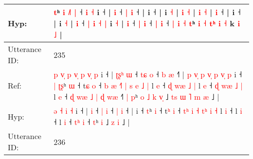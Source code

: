 \documentclass[10pt]{article}
\DeclareRobustCommand{\hl}[1]{{\textcolor{red}{#1}}}
\begin{document}
\begin{longtable}{ll}
 \\
Hyp: & \hl{}\hl{t}ʰ \hl{i} \hl{}\hl{˩}\hl{˥} \hl{|} ˧ \hl{i} \hl{˧} i ˧ |\hl{}\hl{}\hl{}\hl{} \hl{i} ˧ \hl{|} \hl{i} ˧ |\hl{}\hl{} i ˧ |\hl{}\hl{}\hl{} i \hl{}\hl{˧} | \hl{}\hl{i} \hl{}\hl{˧} |\hl{}\hl{}\hl{}\hl{}\hl{}\hl{}\hl{}\hl{}\hl{} \hl{i} \hl{}\hl{˧} |\hl{}\hl{} \hl{}\hl{i} ˧\hl{}\hl{}\hl{}\hl{}\hl{}\hl{}\hl{} |\hl{}\hl{} i ˧\hl{}\hl{}\hl{}\hl{}\hl{}\hl{} |\hl{}\hl{}\hl{}\hl{}\hl{}\hl{} i \hl{˧} |\hl{}\hl{} \hl{i} ˧ \hl{|} \hl{i} \hl{˧} \hl{|} i \hl{˧} |\hl{}\hl{}\hl{} \hl{i} ˧ \hl{|} \hl{i} ˧ \hl{|} \hl{i} ˧\hl{}\hl{} \hl{|} \hl{i} \hl{˧} \hl{t}ʰ\hl{}\hl{}\hl{}\hl{} \hl{}\hl{i} \hl{˧} \hl{t}\hl{ʰ} \hl{i} \hl{˧} k \hl{}\hl{i} \hl{˩} |
 \\
\midrule
Utterance ID: & 235 \\
Ref: & \hl{p}\hl{ }\hl{v}\hl{̩}\hl{ }\hl{p}\hl{ }\hl{v}\hl{̩} \hl{p} \hl{v}\hl{̩} \hl{p} i ˧ |\hl{ }\hl{ʈ}\hl{ʂ}\hl{ʰ} \hl{ɯ} ˧ \hl{t}\hl{ɕ} \hl{o} ˧ \hl{b} \hl{æ} ˧\hl{˥} |\hl{ }\hl{p}\hl{ }\hl{v}\hl{̩}\hl{ }\hl{p}\hl{ }\hl{v}\hl{̩}\hl{ }\hl{p}\hl{ }\hl{v}\hl{̩}\hl{ }\hl{p} i ˧\hl{ }\hl{|} \hl{ʈ}\hl{ʂ}ʰ \hl{ɯ} ˧ t\hl{ɕ} \hl{o} ˧ \hl{b}\hl{ }\hl{æ} \hl{˧}\hl{˥} \hl{|} \hl{s}\hl{ }\hl{e} \hl{˩} \hl{|} l \hl{e} ˧\hl{ }\hl{ɖ}\hl{ }\hl{w}\hl{æ}\hl{ }\hl{˩}\hl{ }\hl{|} l \hl{e} ˧\hl{ }\hl{ɖ}\hl{ }\hl{w}\hl{æ}\hl{ }\hl{˩}\hl{ }\hl{|} l \hl{e} ˧\hl{ }\hl{ɖ}\hl{ }\hl{w}\hl{æ}\hl{ }\hl{˩} \hl{|}\hl{ }\hl{ɖ} \hl{w}\hl{æ} ˧\hl{˥}\hl{ }\hl{|} \hl{p}ʰ\hl{ }\hl{o}\hl{ }\hl{˩}\hl{ }\hl{k} \hl{v}\hl{̩} ˩\hl{ }\hl{t}\hl{s}\hl{ }\hl{ɯ}\hl{ }\hl{˥} \hl{m} \hl{æ} ˩ |
 \\
Hyp: & \hl{}\hl{}\hl{}\hl{}\hl{}\hl{}\hl{}\hl{}\hl{ə} \hl{˧} \hl{}\hl{i} \hl{˧} i ˧ |\hl{}\hl{}\hl{}\hl{} \hl{i} ˧ \hl{}\hl{|} \hl{i} ˧ \hl{|} \hl{i} ˧\hl{} |\hl{}\hl{}\hl{}\hl{}\hl{}\hl{}\hl{}\hl{}\hl{}\hl{}\hl{}\hl{}\hl{}\hl{}\hl{}\hl{}\hl{} i ˧\hl{}\hl{} \hl{}\hl{t}ʰ \hl{i} ˧ t\hl{ʰ} \hl{i} ˧ \hl{}\hl{t}\hl{ʰ} \hl{}\hl{i} \hl{˧} \hl{}\hl{t}\hl{ʰ} \hl{i} \hl{˧} l \hl{i} ˧\hl{}\hl{}\hl{}\hl{}\hl{}\hl{}\hl{}\hl{}\hl{} l \hl{i} ˧\hl{}\hl{}\hl{}\hl{}\hl{}\hl{}\hl{}\hl{}\hl{} l \hl{i} ˧\hl{}\hl{}\hl{}\hl{}\hl{}\hl{}\hl{} \hl{}\hl{t}\hl{ʰ} \hl{}\hl{i} ˧\hl{}\hl{}\hl{} \hl{t}ʰ\hl{}\hl{}\hl{}\hl{}\hl{}\hl{} \hl{}\hl{i} ˩\hl{}\hl{}\hl{}\hl{}\hl{}\hl{}\hl{} \hl{z} \hl{i} ˩ |
 \\
\midrule
Utterance ID: & 236 \\

\end{longtable}
\end{document}
